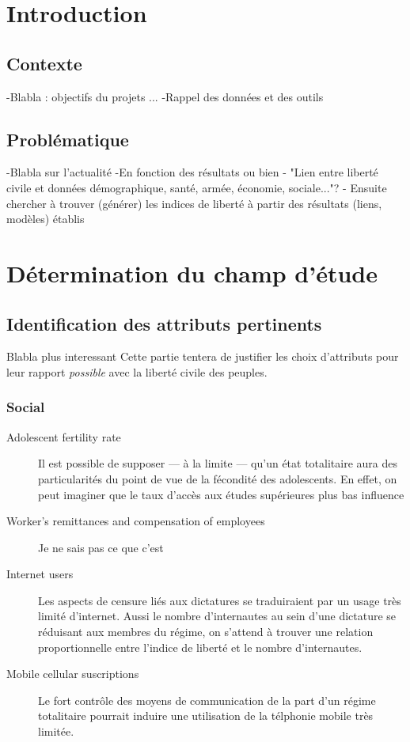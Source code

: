 \section{Introduction}

\subsection{Contexte}
-Blabla : objectifs du projets ...
-Rappel des données et des outils
\subsection{Problématique}
-Blabla sur l'actualité
-En fonction des résultats ou bien 
- "Lien entre liberté civile et données démographique, santé, armée, économie, sociale..."?
- Ensuite chercher à trouver (générer) les indices de liberté à partir des résultats (liens, modèles) établis
\section{Détermination du champ d'étude}
\subsection{Identification des attributs pertinents}
Blabla plus interessant
Cette partie tentera de justifier les choix d'attributs pour leur rapport \emph{possible} avec la liberté civile des peuples.
\subsubsection{Social}
\begin{description}
\item [Adolescent fertility rate] 
Il est possible de supposer --- à la limite --- qu'un état totalitaire aura des particularités du point de vue de la fécondité des adolescents. En effet, on peut imaginer que le taux d'accès aux études supérieures plus bas influence 
\item [Worker's remittances and compensation of employees]
{\huge Je ne sais pas ce que c'est}
\item [Internet users]
Les aspects de censure liés aux dictatures se traduiraient par un usage très limité d'internet. Aussi le nombre d'internautes 
au sein d'une dictature se réduisant aux membres du régime, on s'attend à trouver une relation proportionnelle entre l'indice de liberté et le nombre d'internautes. 
\item [Mobile cellular suscriptions]
Le fort contrôle des moyens de communication de la part d'un régime totalitaire pourrait induire une utilisation de la télphonie mobile très limitée.
\end{description}

